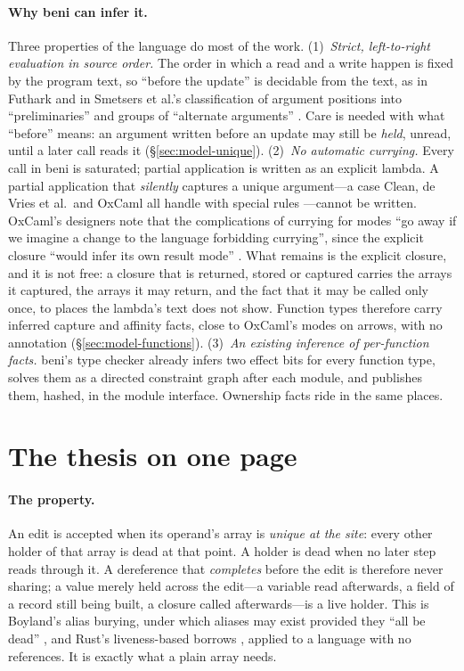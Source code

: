 \paragraph{Why beni can infer it.}
Three properties of the language do most of the work.
(1)~\emph{Strict, left-to-right evaluation in source order.} The order in which a read and a write
happen is fixed by the program text, so ``before the update'' is decidable from the text, as in
Futhark \citep{henriksen2022uniqueness} and in Smetsers et al.'s classification of argument positions
into ``preliminaries'' and groups of ``alternate arguments'' \citep[\S4]{smetsers1994guaranteeing}.
Care is needed with what ``before'' means: an argument written before an update may still be
\emph{held}, unread, until a later call reads it (\S\ref{sec:model-unique}).
(2)~\emph{No automatic currying.} Every call in beni is saturated; partial application is written
as an explicit lambda. A partial application that \emph{silently} captures a unique argument---a case
Clean, de Vries et al.\ and OxCaml all handle with special rules
\citep{barendsen1996uniqueness,devries2008simplified,lorenzen2024oxidizing}---cannot be written.
OxCaml's designers note that the complications of currying for modes ``go away if we imagine a change
to the language forbidding currying'', since the explicit closure ``would infer its own result mode''
\citep[\S6.4]{lorenzen2024oxidizing}. What remains is the explicit closure, and it is not free: a
closure that is returned, stored or captured carries the arrays it captured, the arrays it may
return, and the fact that it may be called only once, to places the lambda's text does not show.
Function types therefore carry inferred capture and affinity facts, close to OxCaml's modes on arrows,
with no annotation (\S\ref{sec:model-functions}).
(3)~\emph{An existing inference of per-function facts.} beni's type checker already infers two effect
bits for every function type, solves them as a directed constraint graph after each module, and
publishes them, hashed, in the module interface. Ownership facts ride in the same places.

\section{The thesis on one page}
\label{sec:intro-onepage}

\paragraph{The property.} An edit is accepted when its operand's array is \emph{unique at the site}:
every other holder of that array is dead at that point. A holder is dead when no later step reads
through it. A dereference that \emph{completes} before the edit is therefore never sharing; a value
merely held across the edit---a variable read afterwards, a field of a record still being built, a
closure called afterwards---is a live holder. This is Boyland's alias burying, under which aliases may
exist provided they ``all be dead'' \citep[\S3.2]{boyland2001alias}, and Rust's liveness-based borrows
\citep{rfc2094}, applied to a language with no references. It is exactly what a plain array needs.

